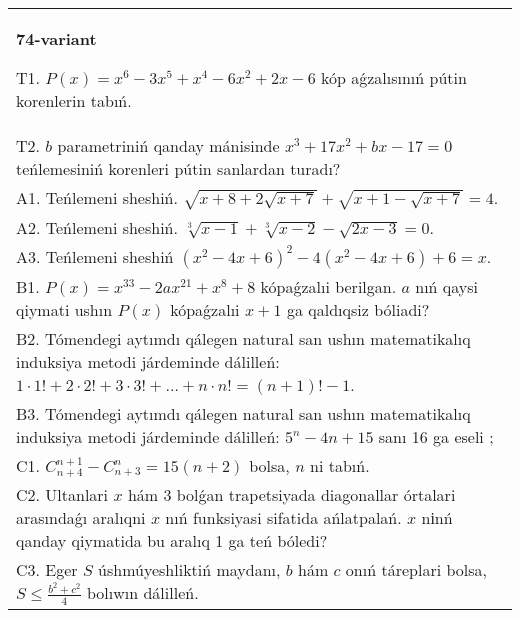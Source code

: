 \documentclass{article}
\begin{document}
\begin{tabular}{m{17cm}}
\textbf{74-variant}
\newline

T1. \(P(x) = x^{6} - 3x^{5} + x^{4} - 6x^{2} + 2x - 6\) kóp aǵzalısınıń pútin korenlerin tabıń. \\
T2. \(b\) parametriniń qanday mánisinde \(x^{3} + 17x^{2} + bx - 17 = 0\) teńlemesiniń korenleri pútin sanlardan turadı? \\
A1. Teńlemeni sheshiń. \(\sqrt{x + 8 + 2\sqrt{x + 7}} + \sqrt{x + 1 - \sqrt{x + 7}} = 4\). \\
A2. Teńlemeni sheshiń. \(\sqrt[3]{x - 1} + \sqrt[3]{x - 2} - \sqrt{2x - 3} = 0\). \\
A3. Teńlemeni sheshiń \(\left( x^{2} - 4x + 6 \right)^{2} - 4\left( x^{2} - 4x + 6 \right) + 6 = x\). \\
B1. \(P(x) = x^{33} - 2ax^{21} + x^{8} + 8\) kópaǵzalıi berilgan. \(a\) nıń qaysi qiymati ushın \(P(x)\) kópaǵzalıi \(x + 1\) ga qaldıqsiz bóliadi? \\
B2. Tómendegi aytımdı qálegen natural san ushın matematikalıq induksiya metodi járdeminde dálilleń: \(1 \cdot 1! + 2 \cdot 2! + 3 \cdot 3! + \ldots + n \cdot n! = (n + 1)! - 1\). \\
B3. Tómendegi aytımdı qálegen natural san ushın matematikalıq induksiya metodi járdeminde dálilleń: \(5^{n} - 4n + 15\) sanı 16 ga eseli ; \\
C1. \(C_{n + 4}^{n + 1} - C_{n + 3}^{n} = 15(n + 2)\) bolsa, \(n\) ni tabıń. \\
C2. Ultanlari \(x\) hám 3 bolǵan trapetsiyada diagonallar órtalari arasındaǵı aralıqni \(x\) nıń funksiyasi sifatida ańlatpalań. \(x\) nіnń qanday qiymatida bu aralıq 1 ga teń bóledi? \\
C3. Eger \(S\) úshmúyeshliktiń maydanı, \(b\) hám \(c\) onıń táreplari bolsa, \(S \leq \frac{b^{2} + c^{2}}{4}\) bolıwın dálilleń. \\

\end{tabular}
\vspace{1cm}
\end{document}
